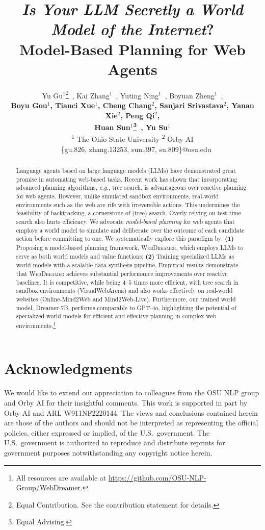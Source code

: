 \documentclass{article} %
\title{\textit{Is Your LLM Secretly a World Model of the Internet}?\\ Model-Based Planning for Web Agents}
\author{
\quad\quad\quad\quad\quad\quad Yu Gu$^{1}$\thanks{Equal Contribution. See the contribution statement for details.}~, Kai Zhang$^{1}$\footnotemark[1]~, Yuting Ning$^{1}$\footnotemark[1]~, Boyuan Zheng$^{1}$\footnotemark[1]~, \\
\textbf{Boyu Gou$^{1}$, Tianci Xue$^{1}$, Cheng Chang$^{2}$, Sanjari Srivastava$^{2}$, Yanan Xie$^{2}$, Peng Qi$^{2}$,} \\
\quad\quad\quad\quad\quad\quad\quad\quad\quad\quad\quad\quad\quad\quad \textbf{Huan Sun$^{1}$\thanks{Equal Advising.}~, Yu Su$^{1}$\footnotemark[2]}
\\[1.2ex]
\quad\quad\quad\quad\quad\quad\quad\quad\quad 
\textsuperscript{1} The Ohio State University \quad \textsuperscript{2} Orby AI
\\
\quad\quad\quad\quad\quad\quad\quad\quad~~\small{\{gu.826, zhang.13253, sun.397, su.809\}@osu.edu}}
\newcommand\eg[0]{\textit{e.g.}}
\newcommand{\OurMethod}{\textsc{WebDreamer}\xspace}
\begin{document}
\ifcolmsubmission
\linenumbers
\fi

\maketitle

\begin{abstract}
Language agents based on large language models (LLMs) have demonstrated great promise in automating web-based tasks.
Recent work has shown that incorporating advanced planning algorithms, \eg, tree search, is advantageous over reactive planning for web agents.
However, unlike simulated sandbox environments, real-world environments such as the web are rife with irreversible actions. 
This undermines the feasibility of backtracking, a cornerstone of (tree) search.  
Overly relying on test-time search also hurts efficiency. 
We advocate \textit{model-based planning} for web agents that employs a world model to simulate and deliberate over the outcome of each candidate action before committing to one. 
We systematically explore this paradigm by: \textbf{(1)} Proposing a model-based planning framework, \OurMethod, which employs LLMs to serve as both world models and value functions; \textbf{(2)} Training specialized LLMs as world models with a scalable data synthesis pipeline.
Empirical results demonstrate that \OurMethod achieves substantial performance improvements over reactive baselines.
It is competitive, while being $4$--$5$ times more efficient, with tree search in sandbox environments (VisualWebArena) and also works effectively on real-world websites (Online-Mind2Web and Mind2Web-Live).
Furthermore, our trained world model, Dreamer-7B, performs comparable to GPT-4o, highlighting the potential of specialized world models for efficient and effective planning in complex web environments.\footnote{All resources are available at \url{https://github.com/OSU-NLP-Group/WebDreamer}.}
\end{abstract}










\section*{Acknowledgments} 
We would like to extend our appreciation to colleagues from the OSU NLP group and Orby AI for their insightful comments. 
This work is supported in part by Orby AI and ARL W911NF2220144. 
The views and conclusions contained herein are those of the authors and should not be interpreted as representing the official policies, either expressed or implied, of the U.S.\ government. The U.S.\ government is authorized to reproduce and distribute reprints for government purposes notwithstanding any copyright notice herein.






\newpage
\appendix

\end{document}
